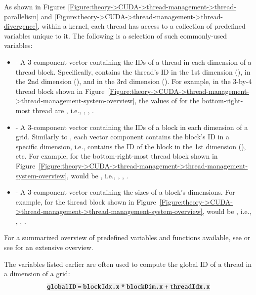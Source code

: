 As shown in Figures \ref{Figure:theory->CUDA->thread-management->thread-parallelism} and \ref{Figure:theory->CUDA->thread-management->thread-divergence}, within a kernel, each thread has access to a collection of predefined variables unique to it.
The following is a selection of such commonly-used variables:

\begin{itemize}
	\item {} - A 3-component vector containing the IDs of a thread in each dimension of a thread block.
Specifically,  contains the thread's ID in the 1st dimension (),  in the 2nd dimension (), and  in the 3rd dimension ().
For example, in the 3-by-4 thread block shown in Figure~\ref{Figure:theory->CUDA->thread-management->thread-management-system-overview}, the values of  for the bottom-right-most thread are , i.e., , , .
	\item {} - A 3-component vector containing the IDs of a block in each dimension of a grid.
Similarly to , each vector component contains the block's ID in a specific dimension, i.e.,  contains the ID of the block in the 1st dimension (), etc.
For example, for the bottom-right-most thread block shown in Figure~\ref{Figure:theory->CUDA->thread-management->thread-management-system-overview},  would be , i.e., , , .
	\item {} - A 3-component vector containing the sizes of a block's dimensions.
For example, for the thread block shown in Figure~\ref{Figure:theory->CUDA->thread-management->thread-management-system-overview},  would be , i.e., , , .
\end{itemize}

For a summarized overview of predefined variables and functions available, see  \cite{Gates2023} or see  \cite{NVIDIADecember2022} for an extensive overview.

The variables listed earlier are often used to compute the global ID of a thread in a dimension of a grid:
$$\code{globalID = blockIdx.x * blockDim.x + threadIdx.x}$$

